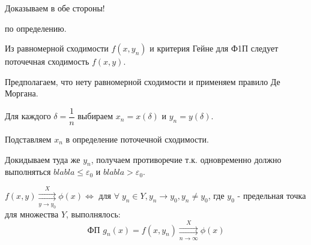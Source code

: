 \begin{col-answer-preambule}
\end{col-answer-preambule}

\begin{plan}
\item Доказываем в обе стороны!
\item \circled{$\Rightarrow$} по определению.
\item \circled{$\Leftarrow$} Из равномерной сходимости $f(x, y_n)$ и критерия Гейне для Ф1П следует поточечная сходимость $f(x, y)$.
\item Предполагаем, что нету равномерной сходимости и применяем правило Де Моргана.
\item Для каждого $\delta = \dfrac{1}{n}$ выбираем $x_n = x(\delta)$ и $y_n = y(\delta)$.
\item Подставляем $x_n$ в определение поточечной сходимости.
\item Докидываем туда же $y_n$, получаем противоречие т.к. одновременно должно выполняться $blabla \leqslant \varepsilon_0$ и $blabla > \varepsilon_0$.
\end{plan}
\begin{theorem}
	$f(x,y) \underset{y \to y_0}{\overset{X}{\rightrightarrows}} \phi(x) \Leftrightarrow$ для $\forall \; y_n \in Y, y_n \to y_0, y_n \ne y_0$, где $y_0$ - предельная точка для множества $Y$, выполнялось:
	\begin{equation}
	\label{eq:lecture04-090}
	\text{ФП }g_n(x) = f(x, y_n) \underset{n \to \infty}{\overset{X}{\rightrightarrows}} \phi(x)
	\end{equation}
\end{theorem}
